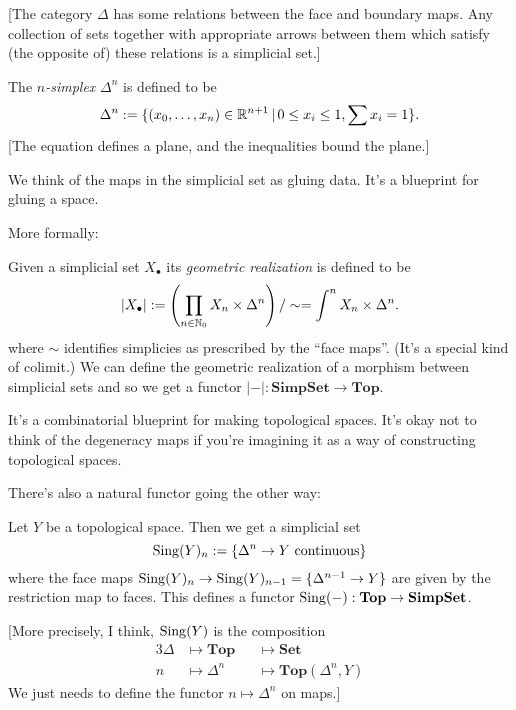 \documentclass[../MH_Total.tex]{subfiles}
\begin{document}
[The category $\Delta$ has some relations between the face and boundary maps. Any collection of sets together with appropriate arrows between them which satisfy (the opposite of) these relations is a simplicial set.]

\begin{definition}
	The \emph{$n$-simplex} $\Delta^n$ is defined to be
	\[
	\Delta^n := \{(x_0,\dots,x_n) \in \mathbb{R}^{n+1}\,|\, 0 \le x_i \le 1, \sum x_i = 1\}.
	\]
	[The equation defines a plane, and the inequalities bound the plane.]
\end{definition}

We think of the maps in the simplicial set as gluing data. It's a blueprint for gluing a space.

More formally:
\begin{definition}
	Given a simplicial set $X_\bullet$ its \emph{geometric realization} is defined to be
	\[
	|X_\bullet| := \left(\prod_{n \in \mathbb{N}_0} X_n \times \Delta^n\right)/\sim = \int^n X_n \times \Delta^n.
	\]
	where $\sim$ identifies simplicies as prescribed by the ``face maps''. (It's a special kind of colimit.) We can define the geometric realization of a morphism between simplicial sets and so we get a functor $|-|: \mathbf{SimpSet} \to \mathbf{Top}$. 
\end{definition}

It's a combinatorial blueprint for making topological spaces. It's okay not to think of the degeneracy maps if you're imagining it as a way of constructing topological spaces.

There's also a natural functor going the other way:

\begin{definition}
	Let $Y$ be a topological space. Then we get a simplicial set 
	\[
	\operatorname{Sing}(Y)_n := \{\Delta^n \to Y \text{ continuous}\}
	\]
	where the face maps $\operatorname{Sing}(Y)_n \to \operatorname{Sing}(Y)_{n-1} = \{\Delta^{n-1} \to Y\}$ are given by the restriction map to faces. This defines a functor $\operatorname{Sing}(-): \mathbf{Top} \to \mathbf{SimpSet}$. 

	[More precisely, I think, $\operatorname{Sing}(Y)$ is the composition
	\begin{alignat*}{3}
		\Delta &\mapsto \mathbf{Top} &&\mapsto \mathbf{Set}\\
		n &\mapsto \Delta^n &&\mapsto \mathbf{Top}(\Delta^n,Y)
	\end{alignat*}
	We just needs to define the functor $n \mapsto \Delta^n$ on maps.]
\end{definition}
\end{document}
